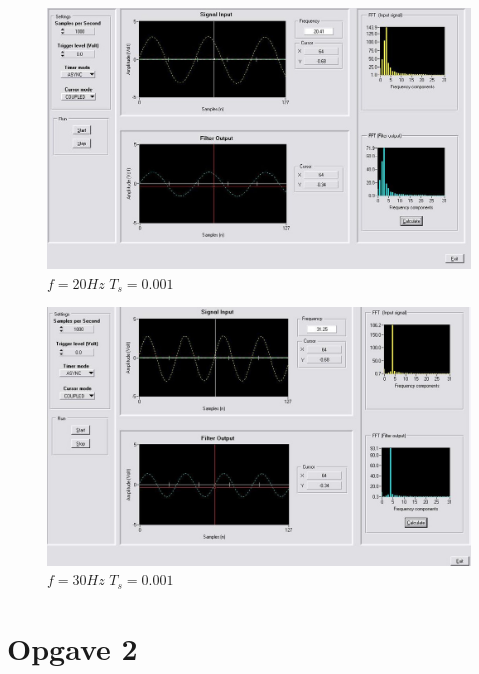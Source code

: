 \documentclass[10pt,a4paper]{article}
\begin{document}
\begin{enumerate}
    \begin{figure}[H]
    \includegraphics[scale=0.5]{1000_20.JPG}
    \caption{$f=20Hz$ $T_{s}=0.001$}
    \end{figure}
    \begin{figure}[H]
    \includegraphics[scale=0.5]{1000_30.JPG}
    \caption{$f=30Hz$ $T_{s}=0.001$}
    \end{figure}


\end{enumerate}


\section*{Opgave 2} %
\label{sec:Opgave 2}
\end{document}
